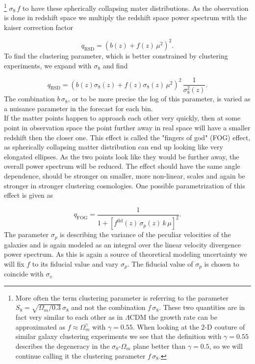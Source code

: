 \documentclass[oneside]{book}
\begin{document}
\footnote{More often the term clustering parameter is referring to the parameter $S_8 = \sqrt{\Omega_m/0.3}\, \sigma_8$ and not the combination $f\,\sigma_8$. These two quantities are in fact very similar to each other as in $\Lambda$CDM the growth rate can be approximated as $f \approx \Omega_m^{\gamma}$ with $\gamma=0.55$. When looking at the 2-D couture of similar galaxy clustering experiments we see that the definition with $\gamma=0.55$ describes the degeneracy in the $\sigma_8$-$\Omega_m$ plane better than $\gamma=0.5$, so we will continue calling it the clustering parameter $f\,\sigma_8$.}
$\sigma_8\,f$ to have these spherically collapsing mater distributions. As the observation is done in redshift space we multiply the redshift space power spectrum with the kaiser correction factor

\begin{equation}
    q_\mathrm{RSD} = \left(b(z) + f(z)\,\mu^2 \right)^2.
\end{equation}
To find the clustering parameter, which is better constrained by clustering experiments, we expand with $\sigma_8$ and find 

\begin{equation*}
    q_\mathrm{RSD} = \left(b(z) \sigma_8(z) + f(z) \sigma_8(z) \,\mu^2 \right)^2\,\frac{1}{\sigma_8^2(z)}.
\end{equation*}
The combination $b\,\sigma_8$, or to be more precise the log of this parameter, is varied as a nuisance parameter in the forecast for each bin.\\
If the matter points  happen to approach each other very quickly, then at some point in observation space the point further away in real space will have a smaller redshift then the closer one. This effect is called the "fingers of god" (FOG) effect, as spherically collapsing matter distribution can end up looking like very elongated ellipses. As the two points look like they would be further away, the overall power spectrum will be reduced. The effect should have the same angle dependence, should be stronger on smaller, more non-linear, scales and again be stronger in stronger clustering cosmologies. One possible parametrization of this effect is given as 

\begin{equation}
q_\mathrm{FOG} = \frac{1}{1+\left[f^\mathrm{fid}(z)\,\sigma_p(z)\,k\,\mu\right]^2}.   
\end{equation}
The parameter $\sigma_p$ is describing the variance of the peculiar velocities of the galaxies and  is again modeled as an integral over the linear velocity divergence power spectrum. As this is again a source of theoretical modeling uncertainty we will fix $f$ to its fiducial value and vary $\sigma_p$. The fiducial value of $\sigma_p$ is chosen to coincide with $\sigma_v$
\end{document}
